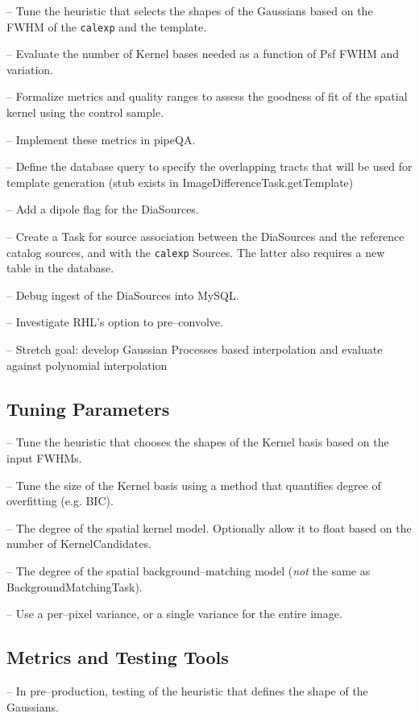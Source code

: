 \documentclass[12pt]{article}
\begin{document}
-- Tune the heuristic that selects the shapes of the Gaussians based
on the FWHM of the {\tt calexp} and the template.

-- Evaluate the number of Kernel bases needed as a function of Psf
FWHM and variation.

-- Formalize metrics and quality ranges to assess the goodness of fit
of the spatial kernel using the control sample.

-- Implement these metrics in pipeQA.

-- Define the database query to specify the overlapping tracts that
will be used for template generation (stub exists in
ImageDifferenceTask.getTemplate)

-- Add a dipole flag for the DiaSources.

-- Create a Task for source association between the DiaSources and the
reference catalog sources, and with the {\tt calexp} Sources.  The
latter also requires a new table in the database.

-- Debug ingest of the DiaSources into MySQL.

-- Investigate RHL's option to pre--convolve.

-- Stretch goal: develop Gaussian Processes based interpolation and
evaluate against polynomial interpolation

\subsection{Tuning Parameters}

-- Tune the heuristic that chooses the shapes of the Kernel basis
based on the input FWHMs.

-- Tune the size of the Kernel basis using a method that quantifies
degree of overfitting (e.g. BIC).

-- The degree of the spatial kernel model.  Optionally allow it to
float based on the number of KernelCandidates.

-- The degree of the spatial background--matching model ({\it not} the
same as BackgroundMatchingTask).

-- Use a per--pixel variance, or a single variance for the entire
image.

\subsection{Metrics and Testing Tools}

-- In pre--production, testing of the heuristic that defines the shape
of the Gaussians.
\end{document}

